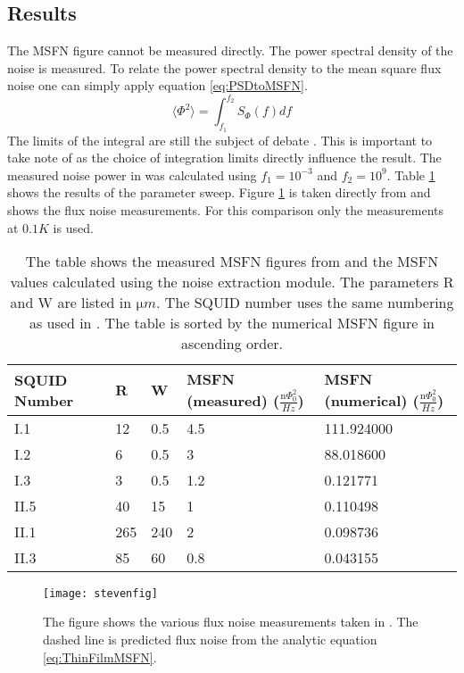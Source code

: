 \subsection{Results}
The MSFN figure cannot be measured directly. The power spectral density of the noise is measured. To relate the power spectral density to the mean square flux noise one can simply apply equation \ref{eq:PSDtoMSFN}.
\begin{equation}
    \langle \Phi^2 \rangle = \int_{f_1}^{f_2}S_\Phi (f) df
    \label{eq:PSDtoMSFN}
\end{equation} 
The limits of the integral are still the subject of debate \cite{fluxNoiseSquidsStevenAnton}. This is important to take note of as the choice of integration limits directly influence the result. The measured noise power in \cite{fluxNoiseSquidsStevenAnton} was calculated using $f_1 = 10^{-3}$ and $f_2 = 10^9$. Table \ref{tab:sweepres} shows the results of the parameter sweep. Figure \ref{fig:stevefig} is taken directly from \cite{fluxNoiseSquidsStevenAnton} and shows the flux noise measurements. For this comparison only the measurements at $0.1 K$ is used. 
\begin{table}[H]
    \centering   
    \begin{tabular}{lllll}
        \hline
        SQUID Number & R & W & MSFN (measured) ($\frac{\si{\nano}\Phi_0^2}{Hz}$) & MSFN (numerical) ($\frac{\si{\nano}\Phi_0^2}{Hz}$)\\ \hline
        I.1 & 12 & 0.5 & 4.5 & 111.924000 \\
        I.2 & 6 & 0.5 & 3 & 88.018600 \\
        I.3 & 3 & 0.5 & 1.2 & 0.121771 \\
        II.5 & 40 & 15 & 1 & 0.110498 \\
        II.1 & 265 & 240 & 2 & 0.098736 \\
        II.3 & 85 & 60 & 0.8 & 0.043155 \\ \hline
    \end{tabular}
    \caption{The table shows the measured MSFN figures from \cite{fluxNoiseSquidsStevenAnton} and the MSFN values calculated using the noise extraction module. The parameters R and W are listed in $\si{\micro m}$. The SQUID number uses the same numbering as used in \cite{fluxNoiseSquidsStevenAnton}. The table is sorted by the numerical MSFN figure in ascending order.}
    \label{tab:sweepres}
\end{table}

\begin{figure}[h]
    \centering
    \texttt{[image: stevenfig]}
    \caption{The figure shows the various flux noise measurements taken in \cite{fluxNoiseSquidsStevenAnton}. The dashed line is predicted flux noise from the analytic equation \ref{eq:ThinFilmMSFN}.}
    \label{fig:stevefig}
\end{figure}

